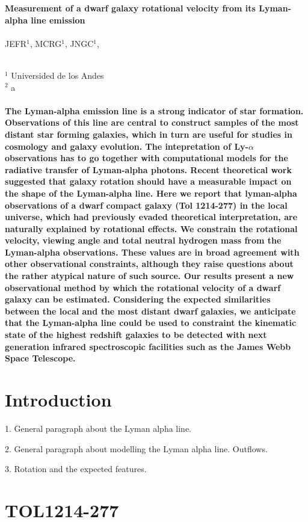 \documentclass[a4paper, 12pt]{article}
\begin{document}
\pagestyle{empty}
\noindent
\textbf{Measurement of a dwarf galaxy rotational velocity from its Lyman-alpha
  line emission}
\\
\\
JEFR$^{1}$, MCRG$^1$, JNGC$^1$,
\\
\\
\scriptsize
{$^1$ Universided de los Andes
\\
$^2$ a
\normalsize
\\
\\
\textbf{The Lyman-alpha emission line is a strong indicator of star formation.
Observations of this line are central to construct samples of the most
distant star forming galaxies, which in turn are useful for studies in
cosmology and galaxy evolution.  
The intepretation of Ly-$\alpha$ observations has to go together with
computational models for the radiative transfer of Lyman-alpha photons.
Recent theoretical work suggested that galaxy rotation should have a
measurable impact on the shape of the Lyman-alpha line. 
Here we report that lyman-alpha observations of a dwarf compact galaxy (Tol
1214-277) in the local universe, which had previously evaded theoretical 
interpretation, are naturally explained by rotational effects.
We constrain the rotational velocity, viewing angle and total
neutral hydrogen mass from the Lyman-alpha observations.
These values are in broad agreement with other observational
constraints, although  they raise questions about the rather atypical nature
of such source.
Our results present a new observational method by which the rotational
velocity of a dwarf galaxy can be estimated. 
Considering the expected similarities between the local and the most
distant dwarf galaxies, we anticipate that the Lyman-alpha line could be
used to constraint the kinematic state of the highest redshift
galaxies to be detected with next generation infrared spectroscopic
facilities such as the James Webb Space Telescope.}



\section{Introduction}

1. General paragraph about the Lyman alpha line.

2. General paragraph about modelling the Lyman alpha
line. Outflows.

3. Rotation and the expected features.

\section{TOL1214-277}

}
\end{document}
